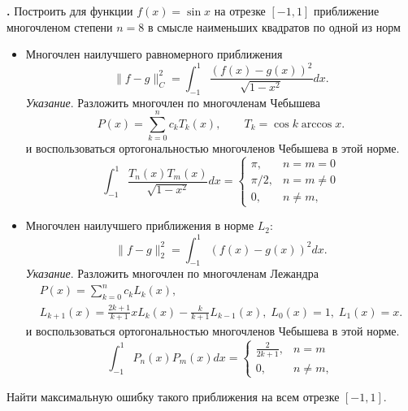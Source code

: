 \documentclass[12pt]{article}
\newcounter{task}
\newcommand{\problem}{\par\textbf{\stepcounter{task}\thetask. }}
\begin{document}
\problem Построить для функции $f(x) = \sin x$ на отрезке $[-1, 1]$
приближение многочленом степени $n = 8$ в смысле наименьших квадратов по одной из норм
\begin{itemize}
\item Многочлен наилучшего равномерного приближения
\[
\|f - g\|_C^2 = \int_{-1}^1 \frac{(f(x) - g(x))^2}{\sqrt{1-x^2}} dx.
\]
\emph{Указание}. Разложить многочлен по многочленам Чебышева
\[
P(x) = \sum_{k=0}^n c_k T_k(x), \qquad
T_k = \cos k \arccos x.
\]
и воспользоваться ортогональностью многочленов Чебышева в этой норме.
\[
\int_{-1}^1 \frac{T_n(x) T_m(x)}{\sqrt{1-x^2}} dx = \begin{cases}
\pi, & n = m = 0\\
\pi/2, & n = m \neq 0\\
0, & n \neq m,
\end{cases}
\]
\item Многочлен наилучшего приближения в норме $L_2$:
\[
\|f - g\|_2^2 = \int_{-1}^1 (f(x) - g(x))^2 dx.
\]
\emph{Указание}. Разложить многочлен по многочленам Лежандра
\begin{gather*}
P(x) = \sum_{k=0}^n c_k L_k(x), \\
L_{k+1}(x) = \frac{2k+1}{k+1} x L_k(x) - \frac{k}{k+1} L_{k-1}(x), \;
L_0(x) = 1,\; L_1(x) = x.
\end{gather*}
и воспользоваться ортогональностью многочленов Чебышева в этой норме.
\[
\int_{-1}^1 P_n(x) P_m(x) dx = \begin{cases}
\frac{2}{2k+1}, & n = m\\
0, & n \neq m,
\end{cases}
\]
\end{itemize}
Найти максимальную ошибку такого приближения на всем отрезке $[-1, 1]$.
\end{document}
